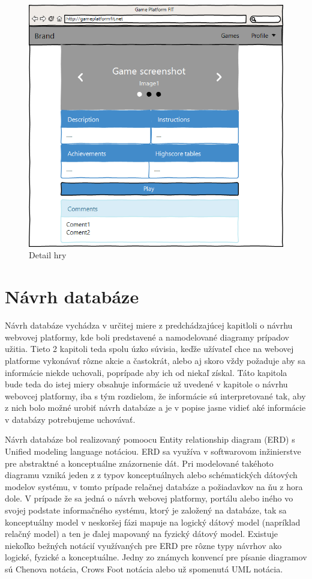\begin{figure}[h]
  \centering
  \includegraphics[scale=0.6]{fig/gui-detail-hry.png}
  \caption{Detail hry}
  \label{fig:guidetailrhy}
\end{figure}

\section{Návrh databáze}
Návrh databáze vychádza v určitej miere z predchádzajúcej kapitloli o návrhu webvovej platformy, kde boli predstavené a namodelované diagramy prípadov užitia. Tieto 2 kapitoli teda spolu úzko súvisia, keďže užívateľ chce na webovej platforme vykonávať rôzne akcie a častokrát, alebo aj skoro vždy požaduje aby sa informácie niekde uchovali, poprípade aby ich od niekaľ získal. Táto kapitola bude teda do istej miery obsahuje informácie už uvedené v kapitole o návrhu webovcej platformy, iba s tým rozdielom, že informácie sú interpretované tak, aby z nich bolo možné urobiť návrh databáze a je v popise jasne vidieť aké informácie v databázy potrebujeme uchovávať.

Návrh databáze bol realizovaný pomoocu Entity relationship diagram (ERD) s Unified modeling language notáciou. ERD sa využíva v softwarovom inžinierstve pre abstraktné a konceptuálne znázornenie dát. Pri modelované takéhoto diagramu vzniká jeden z z typov konceptuálnych alebo schématických dátových modelov systému, v tomto prípade relačnej databáze a požiadavkov na ňu z hora dole. V prípade že sa jedná o návrh webovej platformy, portálu alebo iného vo svojej podstate informačného systému, ktorý je založený na databáze, tak sa konceptuálny model v neskoršej fázi mapuje na logický dátový model (napríklad relačný model) a ten je ďalej mapovaný na fyzický dátový model. Existuje niekoľko bežných notácií využívaných pre ERD pre rôzne typy návrhov ako logické, fyzické a konceptuálne. Jedny zo známych konvencí pre písanie diagramov sú Chenova notácia, Crows Foot notácia alebo už spomenutá UML notácia. 

